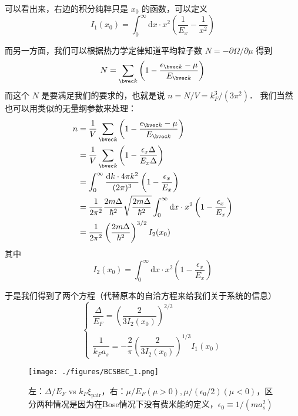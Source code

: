 可以看出来，右边的积分纯粹只是 $x_0$ 的函数，可以定义
\begin{equation}
I_1(x_0) = \int_0^\infty \text{d}x\cdot x^2\left(\frac{1}{E_x}-\frac{1}{x^2}\right)
\end{equation}

而另一方面，我们可以根据热力学定律知道平均粒子数 $N=-\partial\Omega/\partial\mu$ 得到
\begin{equation}
N = \sum_{\bvec k}\left(1-\frac{\epsilon_{\bvec k}-\mu}{E_{\bvec k}}\right)
\end{equation}
而这个 $N$ 是要满足我们的要求的，也就是说 $n=N/V=k_F^3/(3\pi^2)$． 我们当然也可以用类似的无量纲参数来处理：
\begin{equation}
\begin{split}
n &= \frac{1}{V}\sum_{\bvec k}\left(1-\frac{\epsilon_{\bvec k}-\mu}{E_{\bvec k}}\right)\\
&=\frac{1}{V}\sum_{\bvec k}\left(1-\frac{\epsilon_x{\Delta}}{E_x{\Delta}}\right)\\ %
&=\int_0^\infty\frac{\text{d}k \cdot 4\pi k^2}{(2\pi)^3}\left(1-\frac{\epsilon_x}{E_x}\right)\\
&=\frac{1}{2\pi^2}\frac{2m\Delta}{\hbar^2}\sqrt{\frac{2m\Delta}{\hbar^2}}\int_0^\infty\text{d}x\cdot x^2\left(1-\frac{\epsilon_x}{E_x}\right)\\
&=\frac{1}{2\pi^2}\left(\frac{2m\Delta}{\hbar^2}\right)^{3/2}I_2(x_0)
\end{split}
\end{equation}
其中
\begin{equation}
I_2(x_0)=\int_0^\infty \text{d}x\cdot x^2\left(1-\frac{\epsilon_x}{E_x}\right)
\end{equation}

于是我们得到了两个方程（代替原本的自洽方程来给我们关于系统的信息）
\begin{equation}
\begin{cases}
\dfrac{\Delta}{E_F} = \left(\dfrac{2}{3I_2(x_0)}\right)^{2/3}\\
\ \\
\dfrac{1}{k_Fa_s} = -\dfrac{2}{\pi}\left(\dfrac{2}{3I_2(x_0)}\right)^{1/3}I_1(x_0)
\end{cases}
\end{equation}

\begin{figure}[ht]
\centering
\texttt{[image: ./figures/BCSBEC\_1.png]}
\caption{左：$\Delta/E_F$ vs $k_F\xi_{\text{pair}}$，右：$\mu/E_F(\mu>0), \mu/(\epsilon_0/2)(\mu<0)$，区分两种情况是因为在Bose情况下没有费米能的定义，$\epsilon_0\equiv1/(ma_s^2)$} \label{BCSBEC_fig1}
\end{figure}

